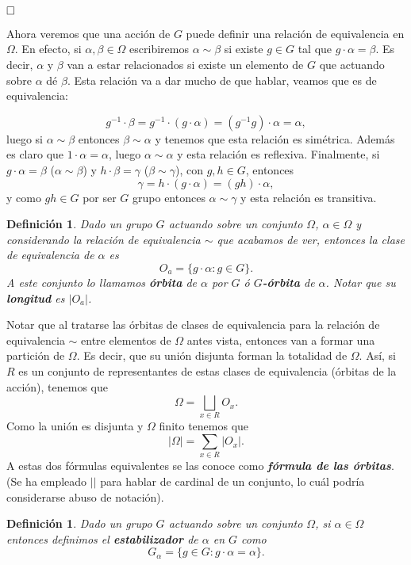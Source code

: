 \documentclass[12pt]{article}
\newtheorem{definition}[theorem]{Definición}
\begin{document}
$\hfill \square$

Ahora veremos que una acción de $G$ puede definir una relación de equivalencia en $\Omega$. En efecto, si $\alpha, \beta \in \Omega$ escribiremos $\alpha \sim \beta $ si existe $g \in G$ tal que $g \cdot \alpha = \beta$. Es decir, $\alpha$ y $\beta$ van a estar relacionados si existe un elemento de $G$ que actuando sobre $\alpha$ dé $\beta$. Esta relación va a dar mucho de que hablar, veamos que es de equivalencia:

$$g^{-1} \cdot \beta = g^{-1} \cdot (g \cdot \alpha ) = (g^{-1}g) \cdot \alpha = \alpha, $$ luego si $\alpha \sim \beta$ entonces $\beta \sim \alpha$ y tenemos que esta relación es simétrica. Además es claro que $1 \cdot \alpha = \alpha$, luego $\alpha \sim \alpha$ y esta relación es reflexiva. Finalmente, si $g \cdot \alpha = \beta$ ($\alpha \sim \beta$) y $h \cdot \beta = \gamma$ ($\beta \sim \gamma$), con $g, h \in G$, entonces $$\gamma = h \cdot (g \cdot \alpha) = (gh) \cdot \alpha,$$ y como $gh \in G$ por ser $G$ grupo entonces $\alpha \sim \gamma$ y esta relación es transitiva.

\begin{definition}Dado un grupo $G$ actuando sobre un conjunto $\Omega$, $\alpha \in \Omega$ y considerando la relación de equivalencia $\sim$ que acabamos de ver, entonces la clase de equivalencia de $\alpha$ es $$O_a = \lbrace g\cdot \alpha : g \in G \rbrace.$$ A este conjunto lo llamamos \textbf{órbita} de $\alpha$ por $G$ ó \textbf{$G$-órbita} de $\alpha$. Notar que su \textbf{longitud} es $|O_a|$.
\end{definition}

Notar que al tratarse las órbitas de clases de equivalencia para la relación de equivalencia $\sim$ entre elementos de $\Omega$ antes vista, entonces van a formar una partición de $\Omega.$ Es decir, que su unión disjunta forman la totalidad de $\Omega$. Así, si $R$ es un conjunto de representantes de estas clases de equivalencia (órbitas de la acción), tenemos que $$\Omega = \bigsqcup_{x\in R} O_x.$$ Como la unión es disjunta y $\Omega$ finito tenemos que $$|\Omega | = \sum_{x\in R} |O_x|.$$ A estas dos fórmulas equivalentes se las conoce como \textbf{\textit{fórmula de las órbitas}}. (Se ha empleado $||$ para hablar de cardinal de un conjunto, lo cuál podría considerarse abuso de notación).

\begin{definition}Dado un grupo $G$ actuando sobre un conjunto $\Omega$, si $\alpha \in \Omega$ entonces definimos el \textbf{estabilizador} de $\alpha$ en $G$ como $$G_\alpha = \lbrace g \in G : g\cdot \alpha = \alpha \rbrace.$$
\end{definition}
\end{document}
